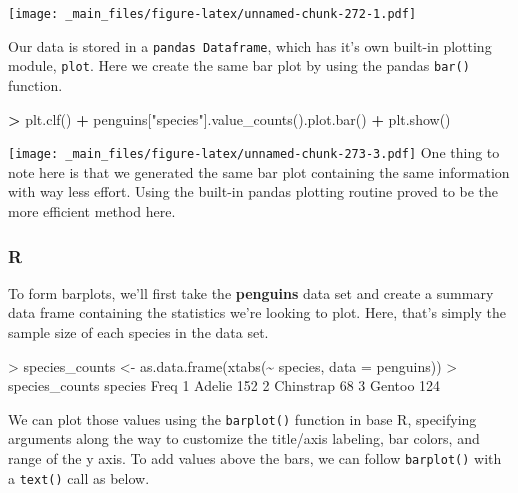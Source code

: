 \documentclass[
]{book}
\newenvironment{Shaded}{\begin{snugshade}}{\end{snugshade}}
\newcommand{\AttributeTok}[1]{\textcolor[rgb]{0.77,0.63,0.00}{#1}}
\newcommand{\DecValTok}[1]{\textcolor[rgb]{0.00,0.00,0.81}{#1}}
\newcommand{\FunctionTok}[1]{\textcolor[rgb]{0.00,0.00,0.00}{#1}}
\newcommand{\NormalTok}[1]{#1}
\newcommand{\OperatorTok}[1]{\textcolor[rgb]{0.81,0.36,0.00}{\textbf{#1}}}
\newcommand{\OtherTok}[1]{\textcolor[rgb]{0.56,0.35,0.01}{#1}}
\newcommand{\SpecialCharTok}[1]{\textcolor[rgb]{0.00,0.00,0.00}{#1}}
\newcommand{\StringTok}[1]{\textcolor[rgb]{0.31,0.60,0.02}{#1}}
\begin{document}
\texttt{[image: \_main\_files/figure-latex/unnamed-chunk-272-1.pdf]}

Our data is stored in a \texttt{pandas\ Dataframe}, which has it's own built-in plotting module, \texttt{plot}. Here we create the same bar plot by using the pandas \texttt{bar()} function.

\begin{Shaded}
\begin{Highlighting}[]
\OperatorTok{\textgreater{}}\NormalTok{ plt.clf()}
\OperatorTok{+}\NormalTok{ penguins[}\StringTok{"species"}\NormalTok{].value\_counts().plot.bar()}
\OperatorTok{+}\NormalTok{ plt.show()}
\end{Highlighting}
\end{Shaded}

\texttt{[image: \_main\_files/figure-latex/unnamed-chunk-273-3.pdf]}
One thing to note here is that we generated the same bar plot containing the same information with way less effort. Using the built-in pandas plotting routine proved to be the more efficient method here.

\hypertarget{r-42}{%
\subsubsection*{R}\label{r-42}}

To form barplots, we'll first take the \textbf{penguins} data set and create a summary data frame containing the statistics we're looking to plot. Here, that's simply the sample size of each species in the data set.

\begin{Shaded}
\begin{Highlighting}[]
\SpecialCharTok{\textgreater{}}\NormalTok{ species\_counts }\OtherTok{\textless{}{-}} \FunctionTok{as.data.frame}\NormalTok{(}\FunctionTok{xtabs}\NormalTok{(}\SpecialCharTok{\textasciitilde{}}\NormalTok{ species, }\AttributeTok{data =}\NormalTok{ penguins))}
\SpecialCharTok{\textgreater{}}\NormalTok{ species\_counts}
\NormalTok{    species Freq}
\DecValTok{1}\NormalTok{    Adelie  }\DecValTok{152}
\DecValTok{2}\NormalTok{ Chinstrap   }\DecValTok{68}
\DecValTok{3}\NormalTok{    Gentoo  }\DecValTok{124}
\end{Highlighting}
\end{Shaded}

We can plot those values using the \texttt{barplot()} function in base R, specifying arguments along the way to customize the title/axis labeling, bar colors, and range of the y axis. To add values above the bars, we can follow \texttt{barplot()} with a \texttt{text()} call as below.
\end{document}

